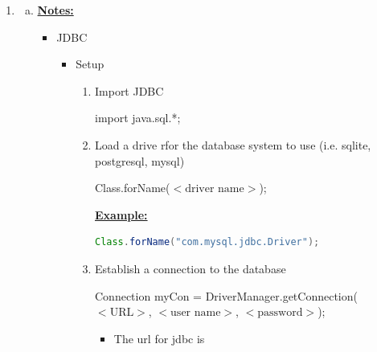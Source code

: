 \documentclass[12pt]{article}
\begin{document}
\begin{enumerate}[1.]
\begin{enumerate}[a)]
    \end{enumerate}

    \item

    \begin{enumerate}[a)]
        \item

        \bigskip

        \underline{\textbf{Notes:}}

        \bigskip

        \begin{itemize}
            \item JDBC
            \begin{itemize}
                \item Setup

                \bigskip

                \begin{enumerate}[1.]
                    \item Import JDBC

                    \bigskip

                    import java.sql.*;

                    \bigskip

                    \item Load a drive rfor the database system to use (i.e. sqlite, postgresql, mysql)

                    \bigskip

                    Class.forName($<\text{driver name}>$);

                    \bigskip

                    \underline{\textbf{Example:}}

                    \bigskip

    \begin{lstlisting}[language=JAVA]
    Class.forName("com.mysql.jdbc.Driver");
    \end{lstlisting}

                    \bigskip

                    \item Establish a connection to the database

                    \bigskip

                    Connection myCon = DriverManager.getConnection($<\text{URL}>$, $<\text{user name}>$, $<\text{password}>$);

                    \begin{itemize}
                        \item The url for jdbc is


\end{itemize}
\end{enumerate}
\end{itemize}
\end{itemize}
\end{enumerate}
\end{enumerate}
\end{document}
